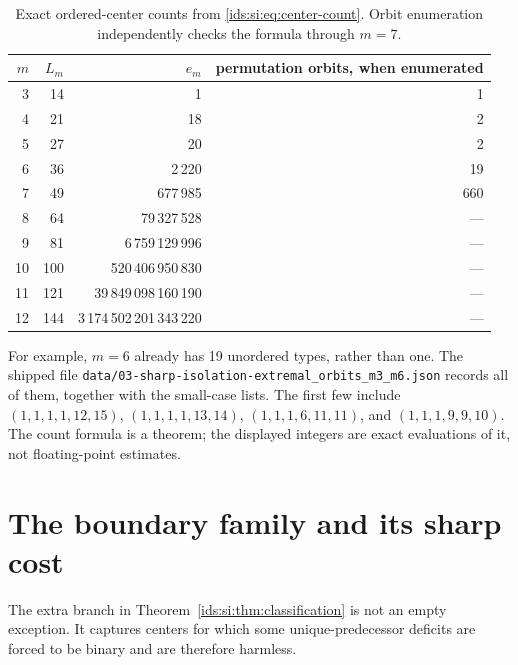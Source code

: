 \documentclass[11pt,letterpaper]{article}
\theoremstyle{definition}\newtheorem{definition}[theorem]{Definition}
\theoremstyle{remark}\newtheorem{remark}[theorem]{Remark}
\theoremstyle{definition}\newtheorem{question}[theorem]{Question}
\begin{document}
\begin{table}[htbp]
\centering\small
\caption{Exact ordered-center counts from \eqref{ids:si:eq:center-count}.
Orbit enumeration independently checks the formula through $m=7$.}
\label{ids:si:tab:counts}
\begin{tabular}{rrrr}
\toprule
$m$ & $L_m$ & $e_m$ & permutation orbits, when enumerated\\
\midrule
3&14&1&1\\
4&21&18&2\\
5&27&20&2\\
6&36&2\,220&19\\
7&49&677\,985&660\\
8&64&79\,327\,528&---\\
9&81&6\,759\,129\,996&---\\
10&100&520\,406\,950\,830&---\\
11&121&39\,849\,098\,160\,190&---\\
12&144&3\,174\,502\,201\,343\,220&---\\
\bottomrule
\end{tabular}
\end{table}
For example, $m=6$ already has 19 unordered types, rather than one. The
shipped file \nolinkurl{data/03-sharp-isolation-extremal_orbits_m3_m6.json}
records all of them, together with the small-case lists. The first
few include $(1,1,1,1,12,15)$, $(1,1,1,1,13,14)$,
$(1,1,1,6,11,11)$, and $(1,1,1,9,9,10)$.
The count formula is a theorem; the displayed integers are exact evaluations
of it, not floating-point estimates.

\section{The boundary family and its sharp cost}\label{ids:si:sec:boundary}

The extra branch in Theorem~\ref{ids:si:thm:classification} is not an empty exception.
It captures centers for which some unique-predecessor deficits are forced
to be binary and are therefore harmless.
\end{document}
